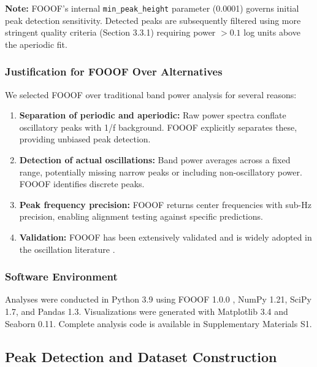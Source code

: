 \documentclass[11pt,a4paper]{article}
\begin{document}
\textbf{Note:} FOOOF's internal \texttt{min\_peak\_height} parameter (0.0001) governs initial peak detection sensitivity. Detected peaks are subsequently filtered using more stringent quality criteria (Section 3.3.1) requiring power $> 0.1$ log units above the aperiodic fit.

\subsubsection{Justification for FOOOF Over Alternatives}

We selected FOOOF over traditional band power analysis for several reasons:

\begin{enumerate}
    \item \textbf{Separation of periodic and aperiodic:} Raw power spectra conflate oscillatory peaks with 1/f background. FOOOF explicitly separates these, providing unbiased peak detection.
    
    \item \textbf{Detection of actual oscillations:} Band power averages across a fixed range, potentially missing narrow peaks or including non-oscillatory power. FOOOF identifies discrete peaks.
    
    \item \textbf{Peak frequency precision:} FOOOF returns center frequencies with sub-Hz precision, enabling alignment testing against specific predictions.
    
    \item \textbf{Validation:} FOOOF has been extensively validated and is widely adopted in the oscillation literature \citep{donoghue2020}.
\end{enumerate}

\subsubsection{Software Environment}

Analyses were conducted in Python 3.9 using FOOOF 1.0.0 \citep{donoghue2020}, NumPy 1.21, SciPy 1.7, and Pandas 1.3. Visualizations were generated with Matplotlib 3.4 and Seaborn 0.11. Complete analysis code is available in Supplementary Materials S1.

\subsection{Peak Detection and Dataset Construction}
\end{document}
